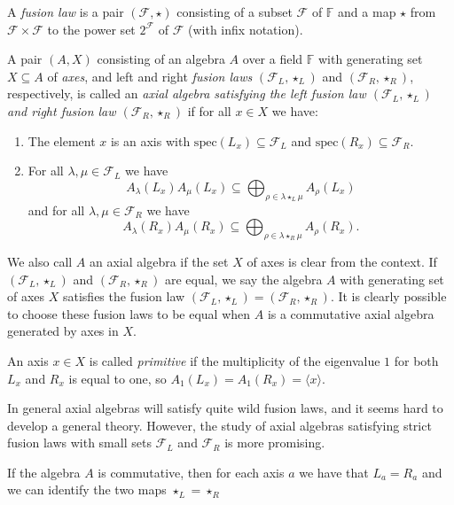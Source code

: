\documentclass[oneside,a4paper]{amsart} %
\theoremstyle{definition}
\begin{document}
A \emph{fusion law} is a pair $(\mathcal{F},\star)$ consisting of a subset $\mathcal{F}$ of $\mathbb{F}$
and a map $\star$ from $\mathcal{F}\times \mathcal{F}$ to the power set $2^\mathcal{F}$ of $\mathcal{F}$
(with infix notation).

A pair $(A,X)$ consisting of an  algebra $A$ over a field $\mathbb{F}$ with generating set $X\subseteq A$ of \emph{axes}, and  left and right \emph{fusion laws} 
$(\mathcal{F}_L,\star_L)$ and $(\mathcal{F}_R,\star_R)$, respectively, 
is called an \emph{axial algebra satisfying the left fusion law $(\mathcal{F}_L,\star_L)$ and right fusion law $(\mathcal{F}_R,\star_R)$} 
if  for all $x\in X$ we have:

\begin{enumerate}
\item The element $x$ is an axis with $\mathrm{spec}(L_x)\subseteq \mathcal{F}_L$ and $\mathrm{spec}(R_x)\subseteq \mathcal{F}_R$.
\item For all $\lambda,\mu\in \mathcal{F}_L$ we have  
$$A_\lambda(L_x) A_\mu(L_x)\subseteq \bigoplus_{\rho\in \lambda\star_L\mu}A_\rho(L_x)$$
and for all $\lambda,\mu\in \mathcal{F}_R$ we have $$A_\lambda(R_x) A_\mu(R_x)\subseteq \bigoplus_{\rho\in \lambda\star_R\mu}A_\rho(R_x).$$
\end{enumerate}

We also call $A$ an axial algebra if the set $X$ of axes is clear from the context.
If $(\mathcal{F}_L,\star_L)$ and $(\mathcal{F}_R,\star_R)$ are equal, we say the algebra $A$ with generating set of axes $X$ satisfies the fusion law 
$(\mathcal{F}_L,\star_L)=(\mathcal{F}_R,\star_R)$.
It is clearly  possible to choose these fusion laws to be equal when $A$ is a commutative axial algebra generated by axes in $X$.

An axis $x\in X$ is called \emph{primitive} if the multiplicity of the eigenvalue $1$ for both $L_x$ and $R_x$ is equal to one, so $A_1(L_x)=A_1(R_x)=\langle x\rangle$.

In general axial algebras will satisfy quite wild fusion laws, and it seems hard 
to develop a general theory. However, the study of axial algebras satisfying strict fusion laws with small sets $\mathcal{F}_L$ and $\mathcal{F}_R$ is more promising.

If the algebra $A$ is commutative, then for each axis $a$ we have that $L_a=R_a$ and we can identify the two maps $\star_L=\star_R$
\end{document}
